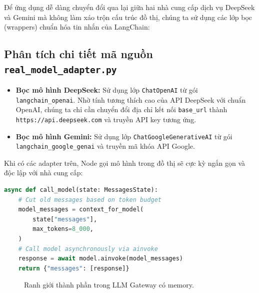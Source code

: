 Để ứng dụng dễ dàng chuyển đổi qua lại giữa hai nhà cung cấp dịch vụ DeepSeek và Gemini mà không làm xáo trộn cấu trúc đồ thị, chúng ta sử dụng các lớp bọc (wrappers) chuẩn hóa tin nhắn của LangChain:

\begingroup

\endgroup

\subsection{Phân tích chi tiết mã nguồn \texttt{real\_model\_adapter.py}}
\begin{itemize}
  \item \textbf{Bọc mô hình DeepSeek:} Sử dụng lớp \texttt{ChatOpenAI} từ gói \texttt{langchain\_openai}. Nhờ tính tương thích cao của API DeepSeek với chuẩn OpenAI, chúng ta chỉ cần chuyển đổi địa chỉ kết nối \texttt{base\_url} thành \texttt{https://api.deepseek.com} và truyền API key tương ứng.
  \item \textbf{Bọc mô hình Gemini:} Sử dụng lớp \texttt{ChatGoogleGenerativeAI} từ gói \texttt{langchain\_google\_genai} và truyền mã khóa API Google.
\end{itemize}

Khi có các adapter trên, Node gọi mô hình trong đồ thị sẽ cực kỳ ngắn gọn và độc lập với nhà cung cấp:

\begin{lstlisting}[language=Python,caption={Thay model quyết định bằng chat model thật}]
async def call_model(state: MessagesState):
    # Cut old messages based on token budget
    model_messages = context_for_model(
        state["messages"],
        max_tokens=8_000,
    )
    # Call model asynchronously via ainvoke
    response = await model.ainvoke(model_messages)
    return {"messages": [response]}
\end{lstlisting}

\begin{figure}[H]
\centering
{}
\caption{Ranh giới thành phần trong LLM Gateway có memory.}
\label{fig:gateway-architecture}
\end{figure}

